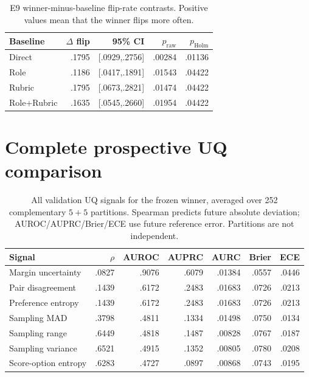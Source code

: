 \documentclass[11pt,twoside,a4paper]{report}
\newcommand{\rawp}{\ensuremath{p_{\mathrm{raw}}}}
\newcommand{\holmp}{\ensuremath{p_{\mathrm{Holm}}}}
\begin{document}
\begin{table}[htbp]
\centering
\caption{E9 winner-minus-baseline flip-rate contrasts.  Positive values mean that
the winner flips more often.}
\label{tab:e9-flip-tests}
\begin{tabular}{lrrrr}
\toprule
Baseline & $\Delta$ flip & 95\% CI & \rawp{} & \holmp{} \\
\midrule
Direct & .1795 & [.0929,.2756] & .00284 & .01136 \\
Role & .1186 & [.0417,.1891] & .01543 & .04422 \\
Rubric & .1795 & [.0673,.2821] & .01474 & .04422 \\
Role+Rubric & .1635 & [.0545,.2660] & .01954 & .04422 \\
\bottomrule
\end{tabular}
\end{table}

\section{Complete prospective UQ comparison}

\begin{table}[htbp]
\centering
\caption{All validation UQ signals for the frozen winner, averaged over 252
complementary $5+5$ partitions.  Spearman predicts future absolute deviation;
AUROC/AUPRC/Brier/ECE use future reference error.  Partitions are not independent.}
\label{tab:uq-all-signals}
\begin{tabular}{lrrrrrr}
\toprule
Signal & $\rho$ & AUROC & AUPRC & AURC & Brier & ECE \\
\midrule
Margin uncertainty & .0827 & .9076 & .6079 & .01384 & .0557 & .0446 \\
Pair disagreement & .1439 & .6172 & .2483 & .01683 & .0726 & .0213 \\
Preference entropy & .1439 & .6172 & .2483 & .01683 & .0726 & .0213 \\
Sampling MAD & .3798 & .4811 & .1334 & .01498 & .0750 & .0134 \\
Sampling range & .6449 & .4818 & .1487 & .00828 & .0767 & .0187 \\
Sampling variance & .6521 & .4915 & .1352 & .00805 & .0780 & .0208 \\
Score-option entropy & .6283 & .4727 & .0897 & .00868 & .0743 & .0195 \\
\bottomrule
\end{tabular}
\end{table}
\end{document}
